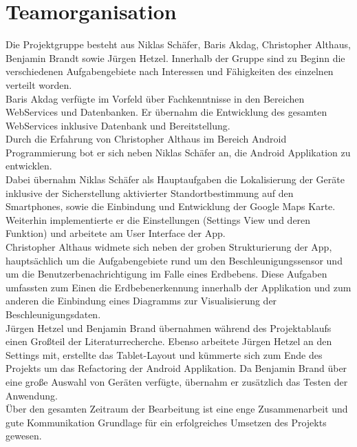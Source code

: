 \section{Teamorganisation}
Die Projektgruppe besteht aus Niklas Schäfer, Baris Akdag, Christopher Althaus, Benjamin Brandt sowie Jürgen Hetzel. Innerhalb der Gruppe sind zu Beginn die verschiedenen Aufgabengebiete nach Interessen und Fähigkeiten des einzelnen verteilt worden.\\
Baris Akdag verfügte im Vorfeld über Fachkenntnisse in den Bereichen WebServices und Datenbanken. Er übernahm die Entwicklung des gesamten WebServices inklusive Datenbank und Bereitstellung.\\
Durch die Erfahrung von Christopher Althaus im Bereich Android Programmierung bot er sich neben Niklas Schäfer an, die Android Applikation zu entwicklen.\\
Dabei übernahm Niklas Schäfer als Hauptaufgaben die Lokalisierung der Geräte inklusive der Sicherstellung aktivierter Standortbestimmung auf den Smartphones, sowie die Einbindung und Entwicklung der Google Maps Karte. Weiterhin implementierte er die Einstellungen (Settings View und deren Funktion) und arbeitete am User Interface der App.\\ 
Christopher Althaus widmete sich neben der groben Strukturierung der App, hauptsächlich um die Aufgabengebiete rund um den Beschleunigungssensor und um die Benutzerbenachrichtigung im Falle eines Erdbebens. Diese Aufgaben umfassten zum Einen die Erdbebenerkennung innerhalb der Applikation und zum anderen die Einbindung eines Diagramms zur Visualisierung der Beschleunigungsdaten.\\
Jürgen Hetzel und Benjamin Brand übernahmen während des Projektablaufs einen Großteil der Literaturrecherche. Ebenso arbeitete Jürgen Hetzel an den Settings mit, erstellte das Tablet-Layout und kümmerte sich zum Ende des Projekts um das Refactoring der Android Applikation.
Da Benjamin Brand über eine große Auswahl von Geräten verfügte, übernahm er zusätzlich das Testen der Anwendung.\\
Über den gesamten Zeitraum der Bearbeitung ist eine enge Zusammenarbeit und gute Kommunikation Grundlage für ein erfolgreiches Umsetzen des Projekts gewesen.
\newpage